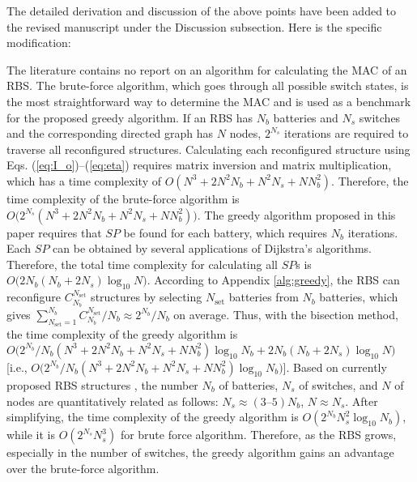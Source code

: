 \begin{revresponse}
The detailed derivation and discussion of the above points have been added to the revised manuscript under the Discussion subsection.
Here is the specific modification:
\begin{changes}
The literature contains no report on an algorithm for calculating the MAC of an RBS.
The brute-force algorithm, which goes through all possible switch states, is the most straightforward way to determine the MAC and is used as a benchmark for the proposed greedy algorithm.
If an RBS has $N_b$ batteries and $N_s$ switches and the corresponding directed graph has $N$ nodes,  $2^{N_s}$ iterations are required to traverse all reconfigured structures.
Calculating each reconfigured structure using Eqs. (\ref{eq:I_o})--(\ref{eq:eta}) requires matrix inversion and matrix multiplication, which has a time complexity of $O(N^3+2N^2N_b+N^2N_s+NN^2_b)$.
Therefore, the time complexity of the brute-force algorithm is $O\bm(2^{N_s}(N^3+2N^2N_b+N^2N_s+NN^2_b)\bm)$.
The greedy algorithm proposed in this paper requires  that $SP$ be found for each battery, which requires $N_b$ iterations.
Each $SP$ can be obtained by several applications of Dijkstra's algorithms.
Therefore, the total time complexity for calculating all $SP$s is $O\bm(2N_b(N_b+2N_s)\log_{10} N\bm)$.
According to  Appendix \ref{alg:greedy}, the RBS can reconfigure $C^{N_{\text{set}}}_{N_b}$ structures by selecting $N_{\text{set}}$ batteries from $N_b$ batteries, which gives $\sum^{N_b}_{N_{\text{set}}=1}C^{N_{\text{set}}}_{N_b}/N_b \approx 2^{N_b}/N_b$ on average.
Thus, with the bisection method, the time complexity of the greedy algorithm is $O\bm(2^{N_b}/N_b(N^3+2N^2N_b+N^2N_s+NN^2_b)\log_{10} N_b+2N_b(N_b+2N_s)\log_{10} N\bm)$ [i.e., $O\bm(2^{N_b}/N_b(N^3+2N^2N_b+N^2N_s+NN^2_b)\log_{10} N_b\bm)$].
Based on currently proposed RBS structures \cite{ciNovelDesignAdaptive2007,alahmadBatterySwitchArray2008,kimDependableEfficientScalable2010b,kimBalancedReconfigurationStorage2011a,taesickimSeriesconnectedSelfreconfigurableMulticell2012a,6843711}, the number $N_b$ of batteries, $N_s$ of switches, and $N$ of nodes are quantitatively related as follows: $N_s \approx (3\text{--} 5)N_b$, $N \approx N_s$. 
After simplifying, the time complexity of the greedy algorithm is $O(2^{N_b}N_s^2\log_{10} N_b)$, while it is $O(2^{N_s}N_s^3)$ for brute force algorithm.
Therefore, as the RBS grows, especially in the number of switches, the greedy algorithm gains an advantage over the brute-force algorithm.


\end{changes}
\end{revresponse}
